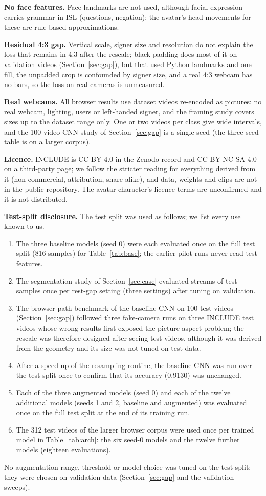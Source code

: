 \documentclass[conference]{IEEEtran}
\begin{document}
\textbf{No face features.} Face landmarks are not used, although facial expression carries grammar in ISL (questions, negation); the avatar's head movements for these are rule-based approximations.

\textbf{Residual 4:3 gap.} Vertical scale, signer size and resolution do not explain the loss that remains in 4:3 after the rescale; black padding does most of it on validation videos (Section~\ref{sec:gap}), but that used Python landmarks and one fill, the unpadded crop is confounded by signer size, and a real 4:3 webcam has no bars, so the loss on real cameras is unmeasured.

\textbf{Real webcams.} All browser results use dataset videos re-encoded as pictures: no real webcam, lighting, users or left-handed signer, and the framing study covers sizes up to the dataset range only. One or two videos per class give wide intervals, and the 100-video CNN study of Section~\ref{sec:gap} is a single seed (the three-seed table is on a larger corpus).

\textbf{Licence.} INCLUDE is CC BY 4.0 in the Zenodo record and CC BY-NC-SA 4.0 on a third-party page; we follow the stricter reading for everything derived from it (non-commercial, attribution, share alike), and data, weights and clips are not in the public repository. The avatar character's licence terms are unconfirmed and it is not distributed.

\textbf{Test-split disclosure.} The test split was used as follows; we list every use known to us.
\begin{enumerate}
\item The three baseline models (seed 0) were each evaluated once on the full test split (816 samples) for Table~\ref{tab:base}; the earlier pilot runs never read test features.
\item The segmentation study of Section~\ref{sec:case} evaluated streams of test samples once per rest-gap setting (three settings) after tuning on validation.
\item The browser-path benchmark of the baseline CNN on 100 test videos (Section~\ref{sec:gap}) followed three fake-camera runs on three INCLUDE test videos whose wrong results first exposed the picture-aspect problem; the rescale was therefore designed after seeing test videos, although it was derived from the geometry and its size was not tuned on test data.
\item After a speed-up of the resampling routine, the baseline CNN was run over the test split once to confirm that its accuracy (0.9130) was unchanged.
\item Each of the three augmented models (seed 0) and each of the twelve additional models (seeds 1 and 2, baseline and augmented) was evaluated once on the full test split at the end of its training run.
\item The 312 test videos of the larger browser corpus were used once per trained model in Table~\ref{tab:arch}: the six seed-0 models and the twelve further models (eighteen evaluations).
\end{enumerate}
No augmentation range, threshold or model choice was tuned on the test split; they were chosen on validation data (Section~\ref{sec:gap} and the validation sweeps).
\end{document}
